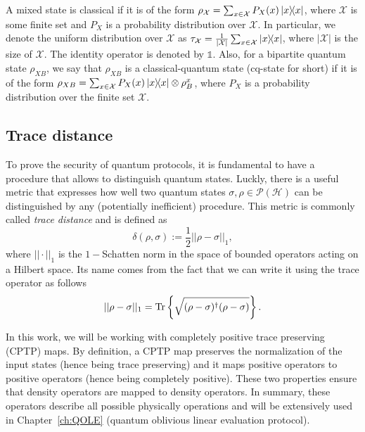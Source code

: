 A mixed state is classical if it is of the form $\rho_{\mathcal{X}} = \sum_{x\in\mathcal{X}} P_X(x)\ketbra{x}$, where $\mathcal{X}$ is some finite set and $P_X$ is a probability distribution over $\mathcal{X}$. In particular, we denote the uniform distribution over $\mathcal{X}$ as $\tau_{\mathcal{X}} = \frac{1}{|\mathcal{X}|}\sum_{x\in\mathcal{X}}\ketbra{x}$, where $|\mathcal{X}|$ is the size of $\mathcal{X}$. The identity operator is denoted by $\mathds{1}$. Also, for a bipartite quantum state $\rho_{XB}$, we say that $\rho_{XB}$ is a classical-quantum state (cq-state for short) if it is of the form $\rho_{XB} = \sum_{x\in \mathcal{X}} P_X(x) \ketbra{x} \otimes \rho^x_{B}$, where $P_X$ is a probability distribution over the finite set $\mathcal{X}$.

\subsection{Trace distance}

To prove the security of quantum protocols, it is fundamental to have a procedure that allows to distinguish quantum states. Luckly, there is a useful metric that expresses how well two quantum states $\sigma, \rho \in \mathcal{P}(\mathcal{H})$ can be distinguished by any (potentially inefficient) procedure. This metric is commonly called \textit{trace distance} and is defined as \cite{U17}
\begin{equation*}
    \delta(\rho,\sigma):=\frac{1}{2}||\rho-\sigma||_1,
\end{equation*}
where $||\cdot||_1$ is the $1-$Schatten norm in the space of bounded operators acting on a Hilbert space. Its name comes from the fact that we can write it using the trace operator as follows
\begin{equation*}
    ||\rho-\sigma||_1=\Tr\left\{\sqrt{(\rho-\sigma)^\dagger(\rho-\sigma)}\right\}.
\end{equation*}

In this work, we will be working with completely positive trace preserving (CPTP) maps. By definition, a CPTP map preserves the normalization of the input states (hence being trace preserving) and it maps positive operators to positive operators (hence being completely positive). These two properties ensure that density operators are mapped to density operators. In summary, these operators describe all possible physically operations and will be extensively used in Chapter~\ref{ch:QOLE} (quantum oblivious linear evaluation protocol). 

